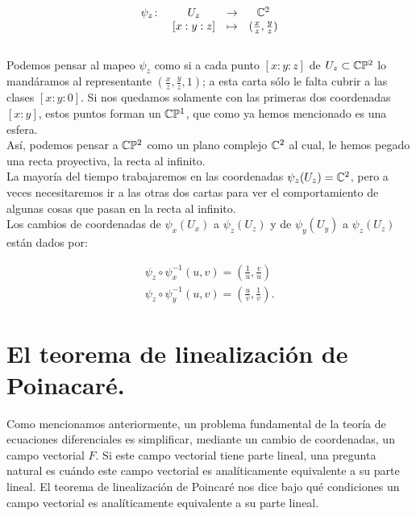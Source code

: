 $$
\begin{matrix}
\psi_{z} \colon & U_{z} &  \rightarrow & \mathbb{C}^{2}\\
& [x:y:z] &  \mapsto &  (\frac{x}{z},\frac{y}{z})
\end{matrix}
$$\\

Podemos pensar al mapeo $\psi_{z}$ como si a cada punto $[x:y:z]$ de $U_{z}\subset\mathbb{C}\mathbb{P}^2$ lo mandáramos al representante $(\tfrac{x}{z},\tfrac{y}{z},1)$; a esta carta sólo le falta cubrir a las clases $[x:y:0]$. Si nos quedamos solamente con las primeras dos coordenadas $[x:y]$, estos puntos forman un $\mathbb{C}\mathbb{P}^{1}$, que como ya hemos mencionado es una esfera.\\

Así, podemos pensar a $\mathbb{C}\mathbb{P}^2$ como un plano complejo $\mathbb{C}^{2}$ al cual, le hemos pegado una recta proyectiva, la recta al infinito.\\ 
 
La mayoría del tiempo trabajaremos en las coordenadas $\psi_{z}(U_{z})=\mathbb{C}^{2}$, pero a veces necesitaremos ir a las otras dos cartas para ver el comportamiento de algunas cosas que pasan en la recta al infinito.\\

Los cambios de coordenadas de $\psi_{x}(U_{x})$ a $\psi_{z}(U_{z})$ y de $\psi_{y}(U_{y})$ a $\psi_{z}(U_{z})$ están dados por:

\begin{equation} 
\label{CambiosDeCoordenadas}
\begin{aligned}
\psi_{z} \circ \psi^{-1}_{x}(u,v) = (\frac{1}{u},\frac{v}{u})\\
\psi_{z} \circ \psi^{-1}_{y}(u,v) = (\frac{u}{v},\frac{1}{v}).
\end{aligned}
\end{equation}


\section{El teorema de linealización de Poinacaré.}

Como mencionamos anteriormente, un problema fundamental de la teoría de ecuaciones diferenciales es simplificar, mediante un cambio de coordenadas, un campo vectorial $F$. Si este campo vectorial tiene parte lineal, una pregunta natural es cuándo este campo vectorial es analíticamente equivalente a su parte lineal. El teorema de linealización de Poincaré nos dice bajo qué condiciones un campo vectorial es analíticamente equivalente a su parte lineal.\\

